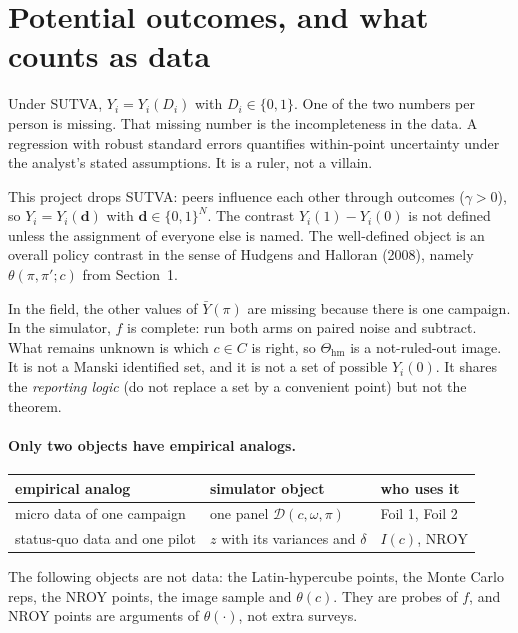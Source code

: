 \documentclass[11pt]{article}
\newcommand{\NROY}{\mathrm{NROY}}
\newcommand{\hm}{\mathrm{hm}}
\begin{document}
\section{Potential outcomes, and what counts as data}
\label{sec:po}

Under SUTVA, $Y_i=Y_i(D_i)$ with $D_i\in\{0,1\}$. One of the two
numbers per person is missing. That missing number is the
incompleteness in the data. A regression with robust standard errors
quantifies within-point uncertainty under the analyst's stated
assumptions. It is a ruler, not a villain.

This project drops SUTVA: peers influence each other through outcomes
($\gamma>0$), so $Y_i=Y_i(\mathbf{d})$ with $\mathbf{d}\in\{0,1\}^N$. The contrast $Y_i(1)-Y_i(0)$ is not defined unless the
assignment of everyone else is named. The well-defined object is an
overall policy contrast in the sense of Hudgens and Halloran (2008), namely $\theta(\pi,\pi';c)$ from Section~1.

In the field, the other values of $\bar Y(\pi)$ are missing because there is one
campaign. In the simulator, $f$ is complete: run both arms on
paired noise and subtract. What remains unknown is which $c\in C$ is right,
so $\Theta_{\hm}$ is a not-ruled-out image. It is not a Manski identified set, and
it is not a set of possible $Y_i(0)$. It shares the \emph{reporting logic}
(do not replace a set by a convenient point) but not the theorem.

\paragraph{Only two objects have empirical analogs.}
\begin{center}
\small
\begin{tabular}{@{}llp{52mm}@{}}
\toprule
empirical analog & simulator object & who uses it \\
\midrule
micro data of one campaign
  & one panel $\mathcal{D}(c,\omega,\pi)$
  & Foil 1, Foil 2 \\
status-quo data and one pilot
  & $z$ with its variances and $\delta$
  & $I(c)$, $\NROY$ \\
\bottomrule
\end{tabular}
\end{center}
The following objects are not data: the Latin-hypercube points, the
Monte Carlo reps, the NROY points, the image sample and $\theta(c)$. They are
probes of $f$, and NROY points are arguments of $\theta(\cdot)$, not extra surveys.
\end{document}
